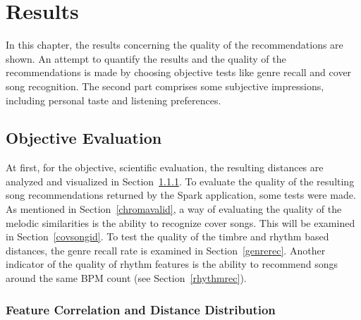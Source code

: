 
\chapter{Results}\label{bds2}

In this chapter, the results concerning the quality of the recommendations are shown. 
An attempt to quantify the results and the quality of the recommendations is made by choosing objective tests like genre recall and cover song recognition. The second part comprises some subjective impressions, including personal taste and listening preferences. 

\section{Objective Evaluation}

At first, for the objective, scientific evaluation, the resulting distances are analyzed and visualized in Section~\ref{featqual}.
To evaluate the quality of the resulting song recommendations returned by the Spark application, some tests were made. As mentioned in Section~\ref{chromavalid}, a way of evaluating the quality of the melodic similarities is the ability to recognize cover songs. This will be examined in Section~\ref{covsongid}. To test the quality of the timbre and rhythm based distances, the genre recall rate is examined in Section~\ref{genrerec}. Another indicator of the quality of rhythm features is the ability to recommend songs around the same BPM count (see Section~\ref{rhythmrec}). 
 

\subsection{Feature Correlation and Distance Distribution}\label{featqual}

